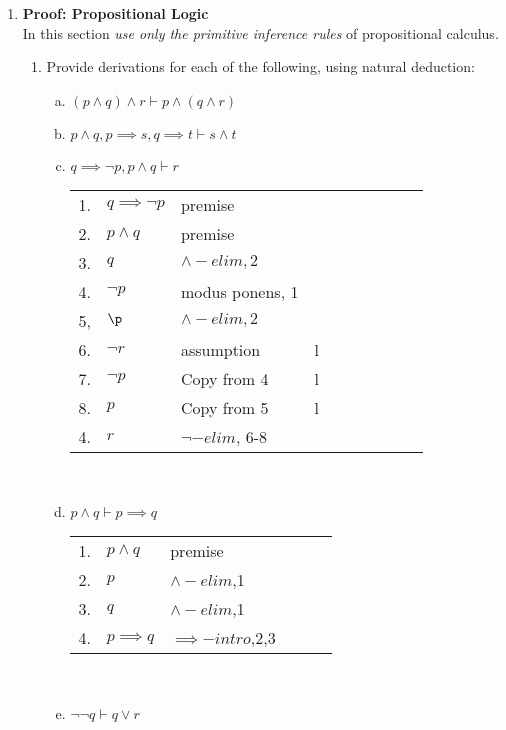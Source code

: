 \documentclass{article}
\begin{document}
\begin{enumerate}[\bf I.]
\item \textbf{Proof: Propositional Logic} \\[6pt]
In this section {\em use only the primitive inference rules} of
propositional calculus.
\begin{enumerate}[1.] \setcounter{enumii}{0}
\item Provide derivations for each of the following, using natural
deduction:
\begin{enumerate}[a.]
 \item $(p \land q)\land r\vdash p \land (q \land r)$ \\
 \item $p \land q,p\implies s,q\implies t\vdash s\land t$ \\
 \item $q \implies \neg p,p\land q\vdash r$ \\
   \begin{tabular}{l ll lll llll}
     1. & $q \implies \neg p$ & premise \\
     2. & $p \land q$         & premise \\
     3. & $q$                 & $\land -elim, 2$ \\
     4. & $\neg p$            & modus ponens, 1 \\  
     5, & $\p$                & $\land -elim, 2$ \\
     6.	& $\neg r$            & assumption  & l\\
     7. & $\neg p$            & Copy from 4 & l\\
     8. & $p$                 & Copy from 5 & l\\
     4. & $r$                 & $\neg -elim$, 6-8 \\
   \end{tabular} \\
 \item $p \land q \vdash p \implies q$ \\
   \begin{tabular}{l ll lll}
     1. & $p \land q$ & premise \\
     2. & $p$         & $\land-elim$,1\\
     3. & $q$         & $\land-elim$,1\\
     4. & $p \implies q$ & $\implies-intro$,2,3 \\
   \end{tabular} \\
 \item $\neg\neg q \vdash q \lor r$ \\

\end{enumerate}
\end{enumerate}
\end{enumerate}
\end{document}

